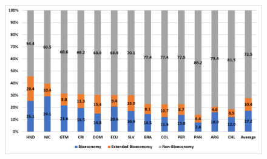 \documentclass[
  letterpaper,
  DIV=11,
  numbers=noendperiod]{scrartcl}
\begin{document}
\begin{figure}

\begin{minipage}{\linewidth}

\includegraphics{images/clipboard-641492741.png}

\end{minipage}%
\newline
\begin{minipage}{\linewidth}



\end{minipage}%
\newline
\begin{minipage}{\linewidth}

\centering{

}
\end{minipage}
\end{figure}
\end{document}
